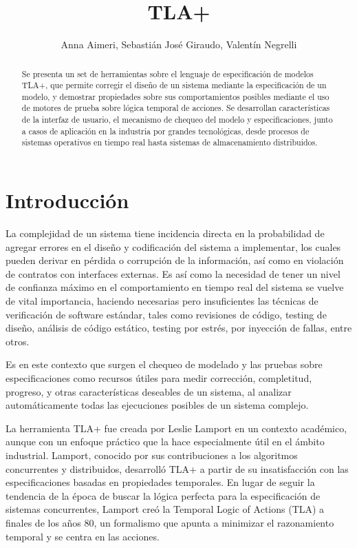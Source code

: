 \documentclass[runningheads]{llncs}
\begin{document}
\title{TLA+}
\author{Anna Aimeri, Sebastián José Giraudo, Valentín Negrelli}
\maketitle             

\begin{abstract}
Se presenta un set de herramientas sobre el lenguaje de especificación de modelos TLA+, que permite corregir el diseño de un sistema mediante la especificación de un modelo, y demostrar propiedades sobre sus comportamientos posibles mediante el uso de motores de prueba sobre lógica temporal de acciones. Se desarrollan características de la interfaz de usuario, el mecanismo de chequeo del modelo y especificaciones, junto a casos de aplicación en la industria por grandes tecnológicas, desde procesos de sistemas operativos en tiempo real hasta sistemas de almacenamiento distribuidos.
\end{abstract}

\section{Introducción}
La complejidad de un sistema tiene incidencia directa en la probabilidad de agregar errores en el diseño y codificación del sistema a implementar, los cuales pueden derivar en pérdida o corrupción de la información, así como en violación de contratos con interfaces externas. Es así como la necesidad de tener un nivel de confianza máximo en el comportamiento en tiempo real del sistema se vuelve de vital importancia, haciendo necesarias pero insuficientes las técnicas de verificación de software estándar, tales como revisiones de código, testing de diseño, análisis de código estático, testing por estrés, por inyección de fallas, entre otros. 

Es en este contexto que surgen el chequeo de modelado y las pruebas sobre especificaciones como recursos útiles para medir corrección, completitud, progreso, y otras características deseables de un sistema, al analizar automáticamente todas las ejecuciones posibles de un sistema complejo.

La herramienta TLA+ fue creada por Leslie Lamport en un contexto académico, aunque con un enfoque práctico que la hace especialmente útil en el ámbito industrial. Lamport, conocido por sus contribuciones a los algoritmos concurrentes y distribuidos, desarrolló TLA+ a partir de su insatisfacción con las especificaciones basadas en propiedades temporales. En lugar de seguir la tendencia de la época de buscar la lógica perfecta para la especificación de sistemas concurrentes, Lamport creó la Temporal Logic of Actions (TLA) a finales de los años 80, un formalismo que apunta a minimizar el razonamiento temporal y se centra en las acciones.
\end{document}

